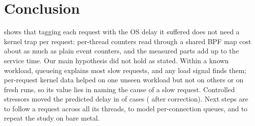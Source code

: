 \section{Conclusion}
\label{sec:conclusion}
\sys{} shows that tagging each request with the OS delay it suffered does
not need a kernel trap per request: per-thread counters read through a
shared BPF map cost about as much as plain event counters, and the measured
parts add up to the service time. Our main hypothesis did not hold as
stated. Within a known workload, queueing explains most slow requests, and
any load signal finds them; per-request kernel data helped on one unseen
workload but not on others or on fresh runs, so its value lies in naming
the cause of a slow request. Controlled stressors moved the predicted delay
in \hTwoRaw{} of \hTwoN{} cases (\hTwoHolm{} after correction). Next steps are to follow a request across all its threads, to
model per-connection queues, and to repeat the study on bare metal.
